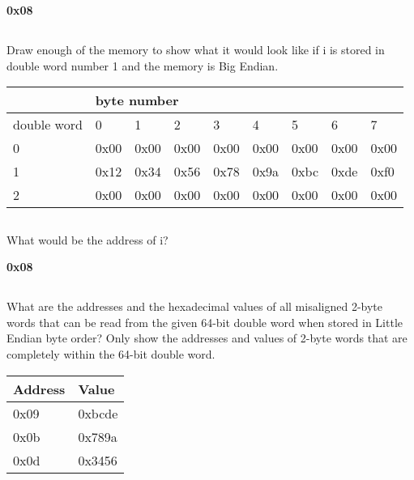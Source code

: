 \documentclass{article}
\begin{document}
\textbf{0x08}
\vspace{5mm}

\subsection{}
Draw enough of the memory to show what it would look like if i is stored in double word number 1 and the memory is Big Endian.
\vspace{5mm}

\begin{tabular}{l|l|l|l|l|l|l|l|l|}
\cline{2-9}
 & \multicolumn{8}{|l|}{byte number} \\ \hline
\multicolumn{1}{|l|}{double word} & 0 & 1 & 2 & 3 & 4 & 5 & 6 & 7 \\ \hline
\multicolumn{1}{|l|}{0} & 0x00 & 0x00 & 0x00 & 0x00 & 0x00 & 0x00 & 0x00 & 0x00 \\ \hline
\multicolumn{1}{|l|}{1} & 0x12 & 0x34 & 0x56 & 0x78 & 0x9a & 0xbc & 0xde & 0xf0 \\ \hline
\multicolumn{1}{|l|}{2} & 0x00 & 0x00 & 0x00 & 0x00 & 0x00 & 0x00 & 0x00 & 0x00 \\ \hline
\end{tabular}
\vspace{5mm}

\subsection{}
What would be the address of i? 
\vspace{5mm}

\textbf{0x08}
\vspace{5mm}
\pagebreak
\subsection{}
What are the addresses and the hexadecimal values of all misaligned 2-byte words that can be read from the given 64-bit double word when stored in Little Endian byte order? Only show the addresses and values of 2-byte words that are completely within the 64-bit double word.
\vspace{5mm}

\begin{tabular}{|l|l|}
\hline
Address & Value \\ 
\hline
0x09 & 0xbcde \\ \hline
0x0b & 0x789a \\ \hline
0x0d & 0x3456 \\ \hline
\end{tabular}
\vspace{5mm}
\end{document}
